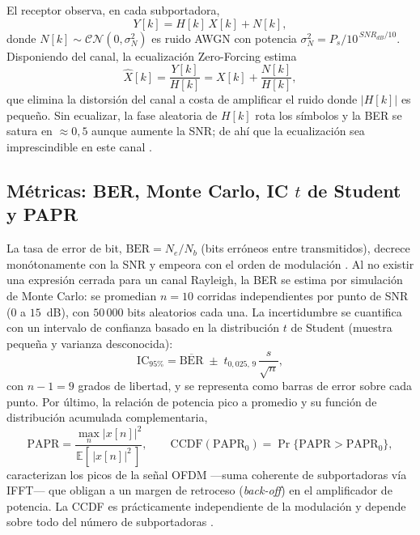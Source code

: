 \documentclass[conference,onecolumn]{IEEEtran}
\begin{document}
El receptor observa, en cada subportadora,
\begin{equation}
Y[k]=H[k]\,X[k]+N[k], \label{eq:rx_model}
\end{equation}
donde $N[k]\sim\mathcal{CN}(0,\sigma_N^2)$ es ruido AWGN con potencia $\sigma_N^2 = P_s/10^{\,SNR_{dB}/10}$. Disponiendo del canal, la ecualizaci\'on Zero-Forcing estima
\begin{equation}
\hat{X}[k]=\frac{Y[k]}{H[k]}=X[k]+\frac{N[k]}{H[k]}, \label{eq:zf}
\end{equation}
que elimina la distorsi\'on del canal a costa de amplificar el ruido donde $|H[k]|$ es peque\~no. Sin ecualizar, la fase aleatoria de $H[k]$ rota los s\'imbolos y la BER se satura en $\approx 0{,}5$ aunque aumente la SNR; de ah\'i que la ecualizaci\'on sea imprescindible en este canal \cite{goldsmith2005}.

\subsection{M\'etricas: BER, Monte Carlo, IC $t$ de Student y PAPR}

La tasa de error de bit, $\mathrm{BER}=N_e/N_b$ (bits err\'oneos entre transmitidos), decrece mon\'otonamente con la SNR y empeora con el orden de modulaci\'on \cite{proakis2008}. Al no existir una expresi\'on cerrada para un canal Rayleigh, la BER se estima por simulaci\'on de Monte Carlo: se promedian $n=10$ corridas independientes por punto de SNR ($0$ a $15$~dB), con $50\,000$ bits aleatorios cada una. La incertidumbre se cuantifica con un intervalo de confianza basado en la distribuci\'on $t$ de Student (muestra peque\~na y varianza desconocida):
\begin{equation}
\mathrm{IC}_{95\%}=\overline{\mathrm{BER}}\;\pm\; t_{0{,}025,\,9}\,\frac{s}{\sqrt{n}},
\end{equation}
con $n-1=9$ grados de libertad, y se representa como barras de error sobre cada punto. Por \'ultimo, la relaci\'on de potencia pico a promedio y su funci\'on de distribuci\'on acumulada complementaria,
\begin{equation}
\mathrm{PAPR}=\frac{\max_n |x[n]|^2}{\mathbb{E}[\,|x[n]|^2\,]}, \qquad \mathrm{CCDF}(\mathrm{PAPR}_0)=\Pr\{\mathrm{PAPR}>\mathrm{PAPR}_0\},
\end{equation}
caracterizan los picos de la se\~nal OFDM ---suma coherente de subportadoras v\'ia IFFT--- que obligan a un margen de retroceso (\textit{back-off}) en el amplificador de potencia. La CCDF es pr\'acticamente independiente de la modulaci\'on y depende sobre todo del n\'umero de subportadoras \cite{han2005}.
\end{document}
